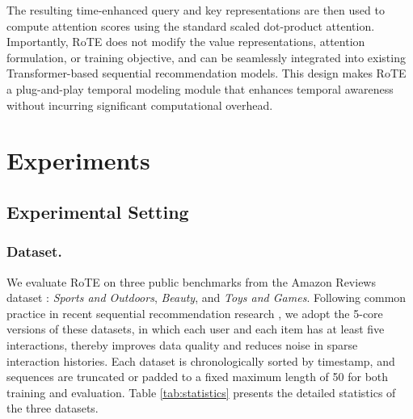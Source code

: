 \documentclass[sigconf,natbib=true]{acmart}
\begin{document}
The resulting time-enhanced query and key representations are then used to compute attention scores using the standard scaled dot-product attention.
Importantly, RoTE does not modify the value representations, attention formulation, or training objective, and can be seamlessly integrated into existing Transformer-based sequential recommendation models.
This design makes RoTE a plug-and-play temporal modeling module that enhances temporal awareness without incurring significant computational overhead.




\section{Experiments}

\subsection{Experimental Setting}

\subsubsection{Dataset.}

We evaluate RoTE on three public benchmarks from the Amazon Reviews dataset \cite{amazon}: \textit{Sports and Outdoors}, \textit{Beauty}, and \textit{Toys and Games}. 
Following common practice in recent sequential recommendation research \cite{tiger}, we adopt the 5-core versions of these datasets, in which each user and each item has at least five interactions, thereby improves data quality and reduces noise in sparse interaction histories. 
Each dataset is chronologically sorted by timestamp, and sequences are truncated or padded to a fixed maximum length of 50 for both training and evaluation. Table \ref{tab:statistics} presents the detailed statistics of the three datasets.
\end{document}
